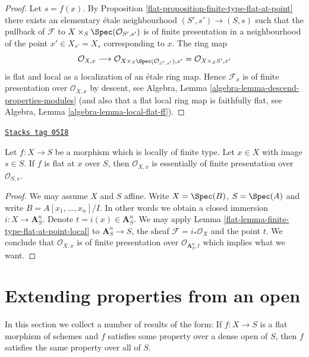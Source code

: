 \begin{proof}

Let $s = f(x)$. By
Proposition \ref{flat-proposition-finite-type-flat-at-point}
there exists an elementary \'etale neighbourhood $(S', s') \to (S, s)$
such that the pullback of $\mathcal{F}$ to
$X \times_S \Spec(\mathcal{O}_{S', s'})$ is of
finite presentation in a neighbourhood of the point $x' \in X_{s'} = X_s$
corresponding to $x$. The ring map
$$
\mathcal{O}_{X, x} \longrightarrow
\mathcal{O}_{X \times_S \Spec(\mathcal{O}_{S', s'}), x'}
=
\mathcal{O}_{X \times_S S', x'}
$$
is flat and local as a localization of an \'etale ring map. Hence
$\mathcal{F}_x$ is of finite presentation over $\mathcal{O}_{X, x}$
by descent, see
Algebra, Lemma \ref{algebra-lemma-descend-properties-modules}
(and also that a flat local ring map is faithfully flat, see
Algebra, Lemma \ref{algebra-lemma-local-flat-ff}).
\end{proof}

\begin{lemma}
\label{flat-lemma-finite-type-flat-at-point-local-X}
\href{https://stacks.math.columbia.edu/tag/05I8}{\texttt{Stacks tag 05I8}}

Let $f : X \to S$ be a morphism which is locally of finite type.
Let $x \in X$ with image $s \in S$. If $f$ is flat at $x$ over $S$, then
$\mathcal{O}_{X, x}$ is essentially of finite presentation over
$\mathcal{O}_{S, s}$.
\end{lemma}

\begin{proof}

We may assume $X$ and $S$ affine. Write $X = \Spec(B)$,
$S = \Spec(A)$ and write $B = A[x_1, \ldots, x_n]/I$.
In other words we obtain a closed immersion $i : X \to \mathbf{A}^n_S$.
Denote $t = i(x) \in \mathbf{A}^n_S$. We may apply
Lemma \ref{flat-lemma-finite-type-flat-at-point-local}
to $\mathbf{A}^n_S \to S$, the sheaf $\mathcal{F} = i_*\mathcal{O}_X$
and the point $t$. We conclude that $\mathcal{O}_{X, x}$ is
of finite presentation over $\mathcal{O}_{\mathbf{A}^n_S, t}$
which implies what we want.
\end{proof}

\section{Extending properties from an open}
\label{flat-section-extending-properties}
In this section we collect a number of results of the form: If $f : X \to S$
is a flat morphism of schemes and $f$ satisfies some property over a dense
open of $S$, then $f$ satisfies the same property over all of $S$.

